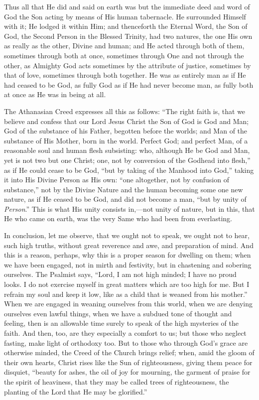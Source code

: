 Thus all that He did and said on earth was but the immediate deed and
word of God the Son acting by means of His human tabernacle. He
surrounded Himself with it; He lodged it within Him; and thenceforth the
Eternal Word, the Son of God, the Second Person in the Blessed Trinity,
had two natures, the one His own as really as the other, Divine and
human; and He acted through both of them, sometimes through both at
once, sometimes through One and not through the other, as Almighty God
acts sometimes by the attribute of justice, sometimes by that of love,
sometimes through both together. He was as entirely man as if He had
ceased to be God, as fully God as if He had never become man, as fully
both at once as He was in being at all.

The Athanasian Creed expresses all this as follows: ``The right
faith is, that we believe and confess that our Lord Jesus Christ the Son
of God is God and Man; God of the substance of his Father, begotten
before the worlds; and Man of the substance of His Mother, born in the
world. Perfect God; and perfect Man, of a reasonable soul and human
flesh subsisting: who, although He be God and Man, yet is not two but
one Christ; one, not by conversion of the Godhead into flesh,'' as
if He could cease to be God, ``but by taking of the Manhood into
God,'' taking it into His Divine Person as His own: ``one
altogether, not by confusion of substance,'' not by the Divine
Nature and the human becoming some one new nature, as if He ceased to be
God, and did not become a man, ``but by unity of \emph{Person}.''
This is what His unity consists in,—not unity of nature, but in this,
that He who came on earth, was the very Same who had been from
everlasting.

In conclusion, let me observe, that we ought not to speak, we ought
not to hear, such high truths, without great reverence and awe, and
preparation of mind. And this is a reason, perhaps, why this is a proper
season for dwelling on them; when we have been engaged, not in mirth and
festivity, but in chastening and sobering ourselves. The Psalmist says,
``Lord, I am not high minded; I have no proud looks. I do not
exercise myself in great matters which are too high for me. But I
refrain my soul and keep it low, like as a child that is weaned from his
mother.'' When we are engaged in weaning ourselves from this world,
when we are denying ourselves even lawful things, when we have a subdued
tone of thought and feeling, then is an allowable time surely to speak
of the high mysteries of the faith. And then, too, are they especially a
comfort to us; but those who neglect fasting, make light of orthodoxy
too. But to those who through God's grace are otherwise minded, the
Creed of the Church brings relief; when, amid the gloom of their own
hearts, Christ rises like the Sun of righteousness, giving them peace
for disquiet, ``beauty for ashes, the oil of joy for mourning, the
garment of praise for the spirit of heaviness, that they may be called
trees of righteousness, the planting of the Lord that He may be
glorified.''

